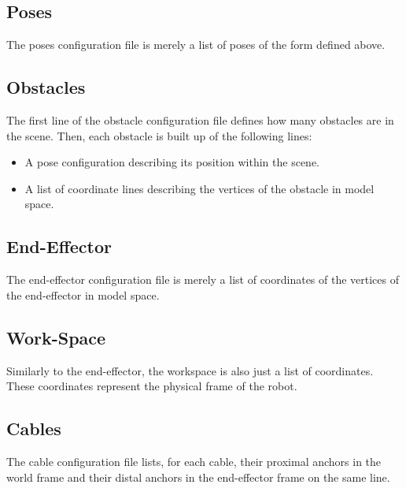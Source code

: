 		\subsection{Poses}

			The poses configuration file is merely a list of poses of the form
			defined above.

		\subsection{Obstacles}

			The first line of  the obstacle configuration file defines how many
			obstacles are in the scene. Then, each obstacle is built up of the
			following lines:

			\begin{itemize}

				\item

					A pose configuration describing its position within the
					scene.

				\item

					A list of coordinate lines describing the vertices of the
					obstacle in model space.

			\end{itemize}

		\subsection{End-Effector}

			The end-effector configuration file is merely a list of coordinates
			of the vertices of the end-effector in model space.

		\subsection{Work-Space}

			Similarly to the end-effector, the workspace is also just a list of
			coordinates. These coordinates represent the physical frame of the
			robot.

		\subsection{Cables}

			The cable configuration file lists, for each cable, their proximal
			anchors in the world frame and their distal anchors in the
			end-effector frame on the same line.

